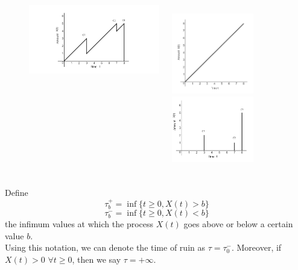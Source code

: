 \documentclass[xcolor=pdftex,dvipsnames,table]{beamer}
\theoremstyle{definition}
\begin{document}
\begin{frame}
\frametitle{\insertsectionhead}
\begin{figure}
\begin{columns}
\begin{column}{0.5\textwidth}
\begin{center}
\includegraphics [width=3.3in]{CL1-1.png}
\end{center}
\end{column}
\begin{column}{0.5\textwidth}  %
\begin{center}
\pause
\includegraphics [width=1.4in]{CL3-1.png}
\pause
\includegraphics [width=1.4in]{CL2-1.png}
\end{center}
\end{column}
\end{columns}
\end{figure}
\end{frame}

\begin{frame}
\frametitle{\insertsectionhead}
Define
\[ \tau_b^+ = \inf\{ t \geq 0, X(t) > b\}\]
\[ \tau_b^- = \inf\{ t \geq 0, X(t) < b\}\]
the infimum values at which the process $X(t)$ goes above or below a certain value $b$.\\
Using this notation, we can denote the time of ruin as $\tau = \tau_0^-$. Moreover, if $X(t) > 0$ $\forall t\geq 0$, then we say $\tau = + \infty$.
\end{frame}
\end{document}
